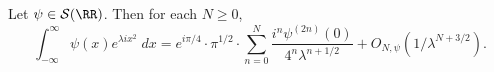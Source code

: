 \begin{theorem}
  Let $\psi \in \mathcal{S}(\RR)$. Then for each $N \geq 0$,
  \[ \int_{-\infty}^\infty \psi(x) e^{\lambda i x^2}\; dx = e^{i \pi / 4} \cdot \pi^{1/2} \cdot \sum_{n = 0}^N \frac{i^n \psi^{(2n)}(0)}{4^n \lambda^{n + 1/2}} + O_{N,\psi}(1/\lambda^{N + 3/2}). \]
\end{theorem}
\begin{comment}
\begin{proof}
  Rescaling, it suffices to prove the theorem when $\psi(x) = 1$ whenever $|x| < 1$. Let $\alpha(x)$ be a smooth function with $\alpha(x) = 1$ for $|x| \geq 1/2$, and with $\alpha(x) = 0$ for $|x| < 1/4$. Then for each $k \geq 1$, define
  \[ \beta_k(x) = \alpha(2^k x) - \alpha(2^{k-1} x). \]
  Then $\beta_k$ is supported on $1/2^{k+2} \leq |x| \leq 1/2^k$, and moreover, for each $x \in \RR$,
  \[ \alpha(x) + \sum_{k = 1}^\infty \beta_k(x) = 1. \]
  It is simple to see that
  \begin{align*}
    \int_{-\infty}^\infty \psi(x) e^{\lambda i x^2}\; dx &= \int_{-\infty}^\infty \alpha(x) \psi(x) e^{\lambda i x^2}\; dx\\
    &\ \ \ \ + \sum_{k = 1}^\infty \int_{-\infty}^\infty \beta_k(x) e^{\lambda i x^2}\; dx.
  \end{align*}
  Now $\alpha \psi$ is a compactly supported amplitude supported away from the origin, so for each $N$,
  \[ \left| \int_{-\infty}^\infty \alpha(x) \psi(x) e^{\lambda i x^2}\; dx \right| \lesssim_{\alpha,\psi,N} \lambda^{-N}. \]
  The same argument works for $\beta_1$, and so by rescaling, for each $k$ and $M$,
  \begin{align*}
    \left| \int_{-\infty}^\infty \beta_k(x) e^{\lambda i x^2}\; dx \right| &\lesssim_{\alpha,\psi,M} 2^{(2M-1)k} \lambda^{-M}.
  \end{align*}
  In particular, we may sum the inequality for small $k$, and with $M$ an appropriate multiple of $N$, to conclude
  \[ \sum_{k = 1}^{\lg(\lambda^{1/2-\varepsilon})} \left| \int_{-\infty}^\infty \beta_k(x) e^{\lambda i x^2}\; dx \right| \lesssim_{\alpha,\psi,N,\varepsilon} \lambda^{-N}. \]
  If we set
  \[ \gamma(x) = \sum_{k = \lg(\lambda^{1/2-\varepsilon})}^\infty \beta_k(x), \]
  then $\gamma(x) = 0$ for $|x| \geq 1/\lambda^{3/4}$, and $\gamma(x) = 1$ for $|x| \leq 1/4\lambda^{3/4}$. Rescaling, we have
  \[ \int_{-\infty}^\infty \gamma(x) e^{\lambda i x^2} = \lambda^{-3/4} \int_{-\infty}^\infty \gamma(x \cdot \lambda^{3/4}) e^{ix^2 / \lambda^{1/2}}. \]
\end{proof}


IDEA: Sum up dyadically on intervals $|x| \sim 2^k \lambda^{-1/2}$, for $k = 1$ to $k = \lfloor \log( \lambda^{1/2} \varepsilon) - 2 \rfloor$, then hopefully the oscillatory integral with phase $x^2$ and amplitude $\psi(x) \sum_{k = \lfloor \lg(\lambda^{1/2} \varepsilon) - 2 \rfloor}^\infty \beta_k(x/\lambda^{1/2})$ decays arbitrarily fast in $\lambda$?


Then for each $n$, define $\beta_n(x) = \alpha(x/2^n) - \alpha(x/2^{n-1})$. Thus we have $\alpha(x) + \sum_{k = 1}^\infty \beta_k(x) = 1$ for all $x \in \RR$. Moreover, $\beta_k$ is supported on $[-2^n, -$

\end{comment}
